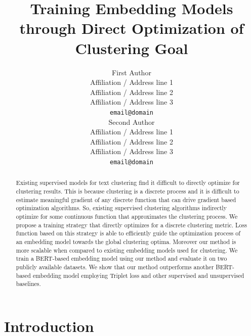 \documentclass[11pt,a4paper]{article}
\title{Training Embedding Models through Direct Optimization of Clustering Goal}
\author{First Author \\
  Affiliation / Address line 1 \\
  Affiliation / Address line 2 \\
  Affiliation / Address line 3 \\
  \texttt{email@domain} \\\And
  Second Author \\
  Affiliation / Address line 1 \\
  Affiliation / Address line 2 \\
  Affiliation / Address line 3 \\
  \texttt{email@domain} \\}
\date{}
\begin{document}
\maketitle
\begin{abstract}
Existing supervised models for text clustering find it difficult to directly optimize for clustering results. This is because clustering is a discrete process and it is difficult to estimate meaningful gradient of any discrete function that can drive gradient based optimization algorithms. So, existing supervised clustering algorithms indirectly optimize for some continuous function that approximates the clustering process. We propose a training strategy that directly optimizes for a discrete clustering metric. Loss function based on this strategy is able to efficiently guide the optimization process of an embedding model towards the global clustering optima. Moreover our method is more scalable when compared to existing embedding models used for clustering. We train a BERT-based embedding model using our method and evaluate it on two publicly available datasets. We show that our method outperforms another BERT-based embedding model employing Triplet loss and other supervised and unsupervised baselines. %
\end{abstract}

\section{Introduction}
\end{document}
